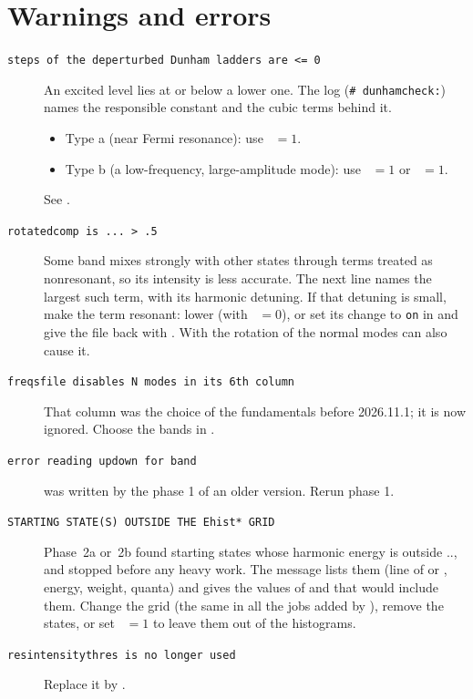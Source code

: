 \chapter{Warnings and errors}\label{ch:trouble}

\begin{description}
\item[\texttt{steps of the deperturbed Dunham ladders are <= 0}] An
  excited level lies at or below a lower one. The log (\texttt{\#
  dunhamcheck:}) names the responsible constant and the cubic terms behind
  it.
  \begin{itemize}
  \item Type a (near Fermi resonance): use ~$=1$.
  \item Type b (a low-frequency, large-amplitude mode): use
    ~$=1$ or ~$=1$.
  \end{itemize}
  See .
\item[\texttt{rotatedcomp is ... > .5}] Some band mixes strongly with
  other states through terms treated as nonresonant, so its intensity is
  less accurate. The next line names the largest such term,
  with its harmonic detuning. If that detuning is small, make the term
  resonant: lower  (with ~$=0$), or set its change to \texttt{on} in
   and give the file back with
  . With  the rotation of the
  normal modes can also cause it.
\item[\texttt{freqsfile disables N modes in its 6th column}] That column
  was the choice of the fundamentals before 2026.11.1; it is now ignored.
  Choose the bands in .
\item[\texttt{error reading updown for band}]  was
  written by the phase 1 of an older version. Rerun phase 1.
\item[\texttt{STARTING STATE(S) OUTSIDE THE Ehist* GRID}] Phase~2a or~2b
  found starting states whose harmonic energy is outside
  .., and stopped before any heavy work. The
  message lists them (line of  or ,
  energy, weight, quanta) and gives the values of  and
   that would include them. Change the grid (the same in all
  the jobs added by ), remove the states, or set
  ~$=1$ to leave them out of the histograms.
\item[\texttt{resintensitythres is no longer used}] Replace it by
  .
\end{description}

